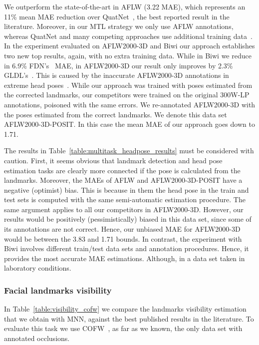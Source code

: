 \documentclass[9pt,technote,compsoc]{IEEEtran}
\begin{document}
We outperform the state-of-the-art in AFLW (3.22 \textrm{MAE}), which represents an 11\% mean \textrm{MAE} reduction over QuatNet~\cite{Hsu18}, the best reported result in the literature. 
Moreover, in our MTL strategy we only use AFLW annotations, whereas QuatNet and many competing approaches use additional training data~\cite{Amador17,Ruiz18,Hsu18,Liu19b,Wiles18b}. 
In the experiment evaluated on AFLW2000-3D and Biwi our approach establishes two new top results, again, with no extra training data. While in Biwi we reduce in 6.9\%  FDN's~\cite{Zhang20} MAE, in AFLW2000-3D our result only improves by 2.3\% GLDL's~\cite{Liu19b}. This is caused by the inaccurate AFLW2000-3D annotations in extreme head poses~\cite{Bulat17b}. While our approach was trained with poses estimated from the corrected landmarks, our competitors were trained on the original 300W-LP annotations, poisoned with the same errors. We re-annotated AFLW2000-3D with the poses estimated from the correct landmarks. We denote this data set AFLW2000-3D-POSIT. In this case the mean MAE of our approach goes down to 1.71.












The results in Table~\ref{table:multitask_headpose_results} must be considered with caution. 
First, it seems obvious that landmark detection and head pose estimation tasks are clearly more connected if the pose is calculated from the landmarks. Moreover, the MAEs of AFLW and AFLW2000-3D-POSIT have a negative (optimist) bias. This is because in them the head pose in the train and test sets is computed with the same semi-automatic estimation procedure. The same argument applies to all our competitors in AFLW2000-3D. However, our results would be positively (pessimistically) biased in this data set, since some of its annotations are not correct. Hence, our unbiased MAE for AFLW2000-3D would be between the 3.83 and 1.71 bounds. In contrast, the experiment with Biwi involves different train/test data sets and annotation procedures. Hence, it provides the most accurate MAE estimations. Although, in a data set taken in laboratory conditions.


\subsubsection{Facial landmarks visibility}

In Table~\ref{table:visibility_cofw} we compare the landmarks visibility estimation that we obtain with MNN, against the best published results in the literature. To evaluate this task we use COFW~\cite{Burgos13}, as far as we known, the only data set with annotated occlusions.
\end{document}
